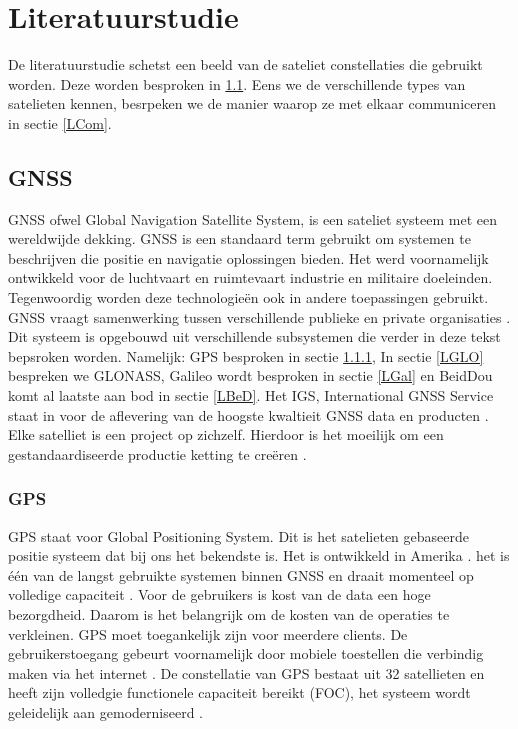 \chapter{Literatuurstudie}
De literatuurstudie schetst een beeld van de sateliet constellaties die gebruikt worden. Deze worden besproken in \ref{LGNS}. Eens we de verschillende types van satelieten kennen, besrpeken we de manier waarop ze met elkaar communiceren in sectie \ref{LCom}.

\section{GNSS}
\label{LGNS}
GNSS ofwel Global Navigation Satellite System, is een sateliet systeem met een wereldwijde dekking. GNSS is een standaard term gebruikt om systemen te beschrijven die positie en navigatie oplossingen bieden. Het werd voornamelijk ontwikkeld voor de luchtvaart en ruimtevaart industrie en militaire doeleinden. Tegenwoordig worden deze technologie\"en ook in andere toepassingen gebruikt. GNSS vraagt samenwerking tussen verschillende publieke en private organisaties \cite{LBibGNSS3}.  Dit systeem is opgebouwd uit verschillende subsystemen die verder in deze tekst bepsroken worden. Namelijk: GPS besproken in sectie \ref{LGPS}, In sectie \ref{LGLO} bespreken we GLONASS, Galileo wordt besproken in sectie \ref{LGal} en BeidDou komt al laatste aan bod in sectie \ref{LBeD}. Het IGS, International GNSS Service staat in voor de aflevering van de hoogste kwaltieit GNSS data en producten \cite{LBibGNSS}. Elke satelliet is een project op zichzelf. Hierdoor is het moeilijk om een gestandaardiseerde productie ketting te creëren \cite{LBibGNSS3}.

\subsection{GPS}
\label{LGPS} 
GPS staat voor Global Positioning System. Dit is het satelieten gebaseerde positie systeem dat bij ons het bekendste is. Het is ontwikkeld in Amerika \cite{LBibGNSS}\cite{LBibGNSS3}. het is \'e\'en van de langst gebruikte systemen binnen GNSS en draait momenteel op volledige capaciteit \cite{LBibGNSS4}. Voor de gebruikers is kost van de data een hoge bezorgdheid. Daarom is het belangrijk om de kosten van de operaties te verkleinen. GPS moet toegankelijk zijn voor meerdere clients. De gebruikerstoegang gebeurt voornamelijk door mobiele toestellen die verbindig maken via het internet \cite{LBibGPS}. De constellatie van GPS bestaat uit 32 satellieten en heeft zijn volledgie functionele capaciteit bereikt (FOC), het systeem wordt geleidelijk aan gemoderniseerd \cite{LBibGNSS4}.

